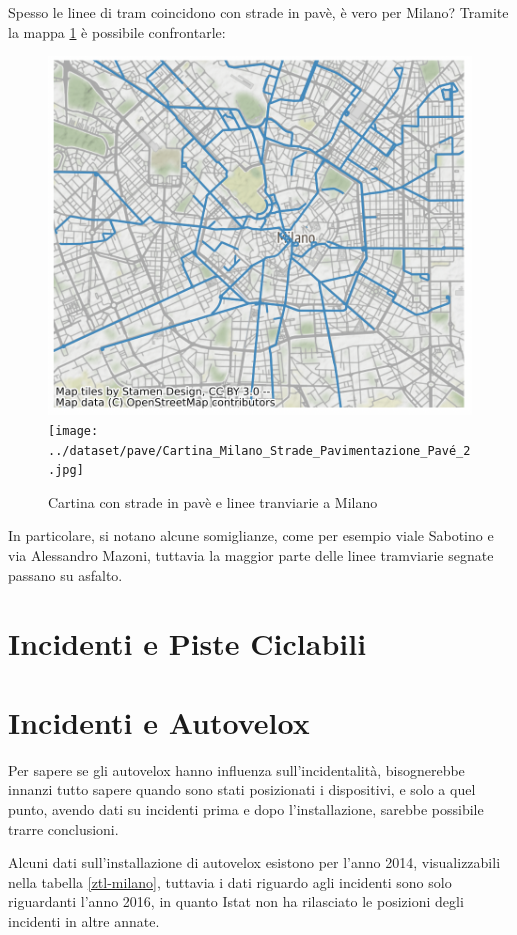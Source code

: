 \documentclass[a4paper]{report}
\begin{document}
Spesso le linee di tram coincidono con strade in pavè, è vero per Milano? 
Tramite la mappa \ref{fig:tram-pave-milano} è possibile confrontarle: 

\begin{figure}
    \includegraphics[width=0.5\linewidth]{../src/tram/tram.png}
    \texttt{[image: ../dataset/pave/Cartina\_Milano\_Strade\_Pavimentazione\_Pavé\_2.jpg]}
    \caption{Cartina con strade in pavè e linee tranviarie a Milano}
    \label{fig:tram-pave-milano}
\end{figure}

In particolare, si notano alcune somiglianze, come per esempio viale Sabotino e via Alessandro Mazoni, 
tuttavia la maggior parte delle linee tramviarie segnate passano su asfalto.


\section{Incidenti e Piste  Ciclabili}


\section{Incidenti e Autovelox}

Per sapere se gli autovelox hanno influenza sull'incidentalità, 
bisognerebbe innanzi tutto sapere quando sono stati posizionati i dispositivi, e solo a quel punto, 
avendo dati su incidenti prima e dopo l'installazione, sarebbe possibile trarre conclusioni.

Alcuni dati sull'installazione di autovelox esistono per l'anno 2014, visualizzabili nella 
tabella \ref{ztl-milano}, tuttavia i dati 
riguardo agli incidenti sono solo riguardanti l'anno 2016, in quanto Istat non ha rilasciato 
le posizioni degli incidenti in altre annate.
\end{document}
